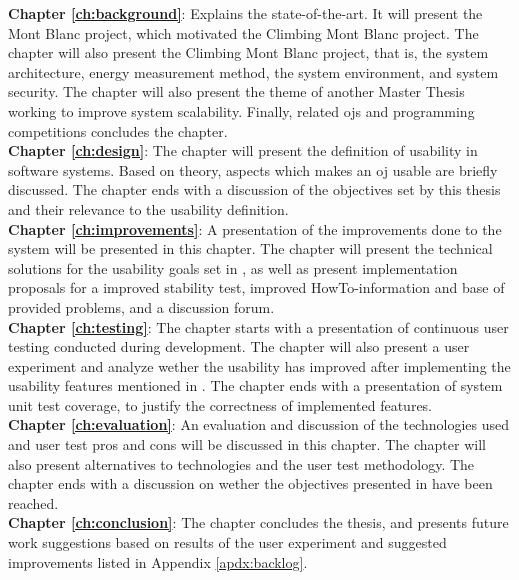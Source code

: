 \textbf{Chapter \ref{ch:background}}: Explains the state-of-the-art. It will present the Mont Blanc project, which motivated the Climbing Mont Blanc project. The chapter will also present the Climbing Mont Blanc project, that is, the system architecture, energy measurement method, the system environment, and system security. The chapter will also present the theme of another Master Thesis working to improve system scalability. Finally, related \glspl{oj} and programming competitions concludes the chapter. \\

\textbf{Chapter \ref{ch:design}}: The chapter will present the definition of usability in software systems. Based on theory, aspects which makes an \gls{oj} usable are briefly discussed. The chapter ends with a discussion of the objectives set by this thesis and their relevance to the usability definition. \\

\textbf{Chapter \ref{ch:improvements}}: A presentation of the improvements done to the system will be presented in this chapter. The chapter will present the technical solutions for the usability goals set in , as well as present implementation proposals for a improved stability test, improved HowTo-information and base of provided problems, and a discussion forum. \\

\textbf{Chapter \ref{ch:testing}}: The chapter starts with a presentation of continuous user testing conducted during development. The chapter will also present a user experiment and analyze wether the usability has improved after implementing the usability features mentioned in . The chapter ends with a presentation of system unit test coverage, to justify the correctness of implemented features. \\

\textbf{Chapter \ref{ch:evaluation}}: An evaluation and discussion of the technologies used and user test pros and cons will be discussed in this chapter. The chapter will also present alternatives to technologies and the user test methodology. The chapter ends with a discussion on wether the objectives presented in  have been reached. \\

\textbf{Chapter \ref{ch:conclusion}}: The chapter concludes the thesis, and presents future work suggestions based on results of the user experiment and suggested improvements listed in Appendix \ref{apdx:backlog}.



